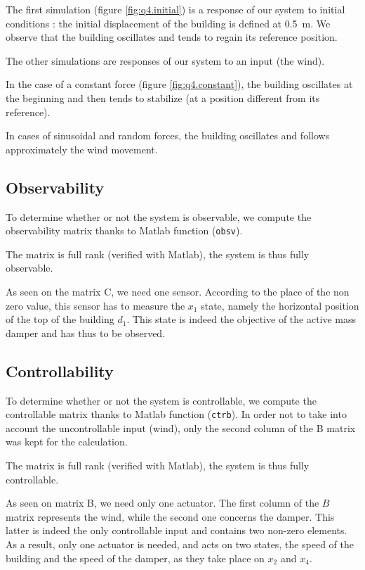 The first simulation (figure \ref{fig:q4.initial}) is a response of our system to initial conditions : the initial displacement of the building is defined at \SI{0.5}{\meter}. We observe that the building oscillates and tends to regain its reference position.\par
The other simulations are responses of our system to an input (the wind).\par
In the case of a constant force (figure \ref{fig:q4.constant}), the building oscillates at the beginning and then tends to stabilize (at a position different from its reference).\par
In cases of sinusoidal and random forces, the building oscillates and follows approximately the wind movement.

\subsection{Observability}
To determine whether or not the system is observable, we compute the observability matrix thanks to Matlab function (\texttt{obsv}).\par
The matrix is full rank (verified with Matlab), the system is thus fully observable.\par
As seen on the matrix C, we need one sensor. According to the place of the non zero value, this sensor has to measure the $x_1$ state, namely the horizontal position of the top of the building $d_1$. This state is indeed the objective of the active mass damper and has thus to be observed.

\subsection{Controllability}
To determine whether or not the system is controllable, we compute the controllable matrix thanks to Matlab function (\texttt{ctrb}). In order not to take into account the uncontrollable input (wind), only the second column of the B matrix was kept for the calculation.\par
The matrix is full rank (verified with Matlab), the system is thus fully controllable.\par
As seen on matrix B, we need only one actuator. The first column of the $B$ matrix represents the wind, while the second one concerns the damper. This latter is indeed the only controllable input and contains two non-zero elements. As a result, only one actuator is needed, and acts on two states, the speed of the building and the speed of the damper, as they take place on $x_2$ and $x_4$.
